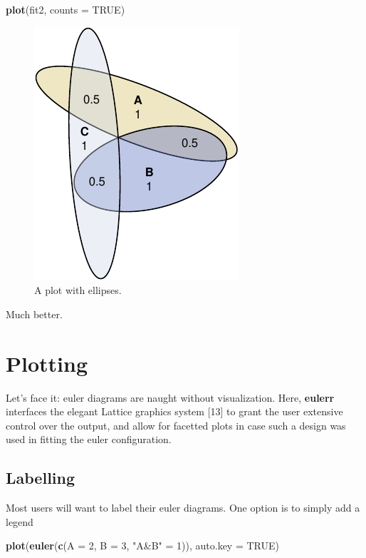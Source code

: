 \documentclass[
  headsepline=true,headings=standardclasses%
]{scrartcl}
\newenvironment{Shaded}{\begin{snugshade}}{\end{snugshade}}
\newcommand{\KeywordTok}[1]{\textcolor[rgb]{0.13,0.29,0.53}{\textbf{#1}}}
\newcommand{\DataTypeTok}[1]{\textcolor[rgb]{0.13,0.29,0.53}{#1}}
\newcommand{\DecValTok}[1]{\textcolor[rgb]{0.00,0.00,0.81}{#1}}
\newcommand{\StringTok}[1]{\textcolor[rgb]{0.31,0.60,0.02}{#1}}
\newcommand{\OtherTok}[1]{\textcolor[rgb]{0.56,0.35,0.01}{#1}}
\newcommand{\NormalTok}[1]{#1}
\theoremstyle{definition}
\theoremstyle{definition}
\theoremstyle{remark}
\begin{document}
\begin{Shaded}
\begin{Highlighting}[]
\KeywordTok{plot}\NormalTok{(fit2, }\DataTypeTok{counts =} \OtherTok{TRUE}\NormalTok{)}
\end{Highlighting}
\end{Shaded}

\begin{figure}
\centering
\includegraphics{thesis_files/figure-latex/unnamed-chunk-9-1.pdf}
\caption{\label{fig:unnamed-chunk-9}A plot with ellipses.}
\end{figure}

Much better.

\section{Plotting}\label{plotting}

Let's face it: euler diagrams are naught without visualization. Here,
\textbf{eulerr} interfaces the elegant Lattice graphics system {[}13{]}
to grant the user extensive control over the output, and allow for
facetted plots in case such a design was used in fitting the euler
configuration.

\subsection{Labelling}\label{labelling}

Most users will want to label their euler diagrams. One option is to
simply add a legend

\begin{Shaded}
\begin{Highlighting}[]
\KeywordTok{plot}\NormalTok{(}\KeywordTok{euler}\NormalTok{(}\KeywordTok{c}\NormalTok{(}\DataTypeTok{A =} \DecValTok{2}\NormalTok{, }\DataTypeTok{B =} \DecValTok{3}\NormalTok{, }\StringTok{"A&B"}\NormalTok{ =}\StringTok{ }\DecValTok{1}\NormalTok{)), }\DataTypeTok{auto.key =} \OtherTok{TRUE}\NormalTok{)}
\end{Highlighting}
\end{Shaded}
\end{document}
